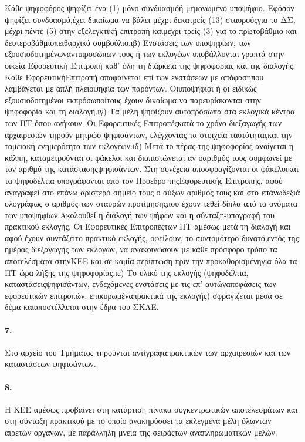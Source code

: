 \documentclass[a4paper,oneside, 10pt]{book}
\begin{document}
Κάθε ψηφοφόρος ψηφίζει ένα (1) μόνο συνδυασμόή μεμονωμένο υποψήφιο. Εφόσον ψηφίζει συνδυασμό,έχει δικαίωμα να βάλει μέχρι δεκατρείς (13) σταυρούςγια το ΔΣ, μέχρι πέντε (5) στην εξελεγκτική επιτροπή καιμέχρι τρείς (3) για το πρωτοβάθμιο και δευτεροβάθμιοπειθαρχικό συμβούλιο.ιβ) Ενστάσεις των υποψηφίων, των εξουσιοδοτημένωναντιπροσώπων τους ή των εκλογέων υποβάλλονται γραπτά στην οικεία Εφορευτική Επιτροπή καθ’ όλη τη διάρκεια της ψηφοφορίας και της διαλογής. Κάθε ΕφορευτικήΕπιτροπή αποφαίνεται επί των ενστάσεων με απόφασηπου λαμβάνεται με απλή πλειοψηφία των παρόντων. Οιυποψήφιοι ή οι ειδικώς εξουσιοδοτημένοι εκπρόσωποίτους έχουν δικαίωμα να παρευρίσκονται στην ψηφοφορία και τη διαλογή.ιγ) Τα μέλη ψηφίζουν αυτοπρόσωπα στα εκλογικά κέντρα των ΠΤ όπου ανήκουν. Οι Εφορευτικές Επιτροπέςκατά το χρόνο διεξαγωγής των αρχαιρεσιών τηρούν μητρώο ψηφισάντων, ελέγχοντας τα στοιχεία ταυτότηταςκαι την ταμειακή ενημερότητα των εκλογέων.ιδ) Μετά το πέρας της ψηφοφορίας ανοίγεται η κάλπη, καταμετρούνται οι φάκελοι και διαπιστώνεται αν οαριθμός τους συμφωνεί με τον αριθμό της κατάστασηςψηφισάντων. Στη συνέχεια αποσφραγίζονται οι φάκελοικαι τα ψηφοδέλτια υπογράφονται από τον Πρόεδρο τηςΕφορευτικής Επιτροπής, αφού αναγραφεί στο επάνω αριστερό σημείο τους ο αύξων αριθμός τους και στο επάνωδεξιά ολογράφως ο αριθμός των σταυρών προτίμησηςπου έχουν τεθεί δίπλα από τα ονόματα των υποψηφίων.Ακολουθεί η διαλογή των ψήφων και η σύνταξη-υπογραφή του πρακτικού εκλογής. Οι Εφορευτικές Επιτροπέςτων ΠΤ αμέσως μετά τη διαλογή και αφού έχουν συντάξειτο πρακτικό εκλογής, οφείλουν, το συντομότερο δυνατό,εντός της ημέρας διεξαγωγής των εκλογών, να ανακοινώσουν με κάθε πρόσφορο τρόπο τα αποτελέσματα στηνΚΕΕ και σε καμία περίπτωση πριν την προκαθορισμένηγια όλα τα ΠΤ ώρα λήξης της ψηφοφορίας.ιε) Το υλικό της εκλογής (ψηφοδέλτια, καταστάσειςψηφισάντων, ενδεχόμενες ενστάσεις με τις επ’ αυτώναποφάσεις των εφορευτικών επιτροπών, επικυρωμέναπρακτικά της εκλογής) σφραγίζεται μέσα σε δέμα καιαποστέλλεται στην έδρα του ΣΚΛΕ.
\paragraph { 7. } Στο αρχείο του Τμήματος τηρούνται αντίγραφαπρακτικών των αρχαιρεσιών και των καταστάσεων ψηφισάντων.
\paragraph { 8. } Η ΚΕΕ αμέσως προβαίνει στη κατάρτιση πίνακα συγκεντρωτικών αποτελεσμάτων και στη σύνταξη πρακτικού με το οποίο ανακηρύσσει τα εκλεγμένα μέλη όλωντων αιρετών οργάνων, με παράλληλη μνεία της σειράςτων αναπληρωματικών μελών.
\end{document}
